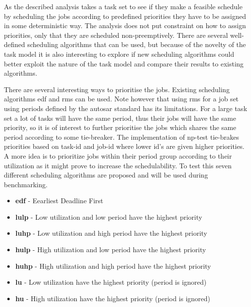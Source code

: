 \documentclass{kththesis}
\begin{document}
As the described analysis takes a task set to see if they make a feasible schedule by
scheduling the jobs according to predefined priorities they have to be assigned in some
deterministic way. The analysis does not put constraint on how to assign priorities, only that they
are scheduled non-preemptively. There are several well-defined scheduling algorithms that can be
used, but because of the novelty of the task model it is also interesting to explore
if new scheduling algorithms could better exploit the nature of the task model and compare their
results to existing algorithms.

There are several interesting ways to prioritise the jobs. Existing scheduling algorithms
\acrshort{edf} and \acrshort{rms} can be used. Note however that using \acrshort{rms} for a job
set using periods defined by the \acrshort{autosar} standard has its limitations. For a large task
set a lot of tasks will have the same period, thus their jobs will have the same priority, so it is
of interest to further prioritise the jobs which shares the same period according to some
tie-breaker. The implementation of \acrshort{np}-test tie-brakes priorities based on task-id and
job-id where lower id's are given higher priorities. A more  idea is to prioritize jobs within their
period group according to their utilization as it might prove to increase the schedulability. To
test this seven different scheduling algorithms are proposed and will be used during benchmarking.

\begin{itemize}
    \item \textbf{\acrshort{edf}} - Eearliest Deadline First
    \item \textbf{\acrshort{lulp}} - Low utilization and low period have the highest priority
    \item \textbf{\acrshort{luhp}} - Low utilization and high period have the highest priority
    \item \textbf{\acrshort{hulp}} - High utilization and low period have the highest priority
    \item \textbf{\acrshort{huhp}} - High utilization and high period have the highest priority
    \item \textbf{\acrshort{lu}} - Low utilization have the highest priority (period is ignored)
    \item \textbf{\acrshort{hu}} - High utilization have the highest priority (period is ignored)
\end{itemize}
\end{document}
